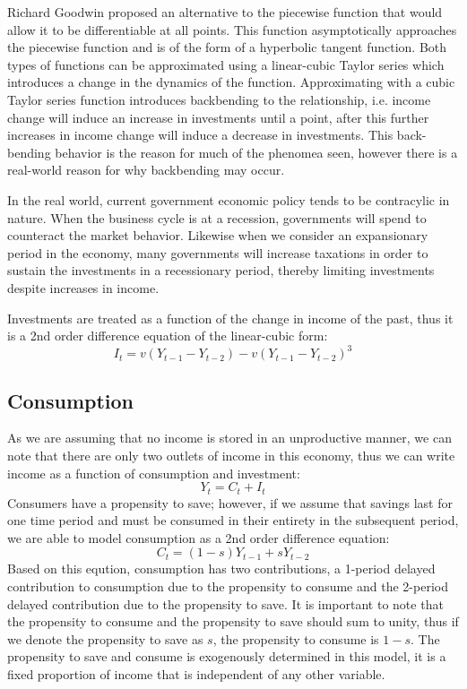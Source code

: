 \documentclass[]{article}
\begin{document}
	Richard Goodwin proposed an alternative to the piecewise function that would allow it to be differentiable at all points. This function asymptotically approaches the piecewise function and is of the form of a hyperbolic tangent function. Both types of functions can be approximated using a linear-cubic Taylor series which introduces a change in the dynamics of the function. Approximating with a cubic Taylor series function introduces backbending to the relationship, i.e. income change will induce an increase in investments until a point, after this further increases in income change will induce a decrease in investments. This back-bending behavior is the reason for much of the phenomea seen, however there is a real-world reason for why backbending may occur.

	In the real world, current government economic policy tends to be contracylic in nature. When the business cycle is at a recession, governments will spend to counteract the market behavior. Likewise when we consider an expansionary period in the economy, many governments will increase taxations in order to sustain the investments in a recessionary period, thereby limiting investments despite increases in income.

	Investments are treated as a function of the change in income of the past, thus it is a 2nd order difference equation of the linear-cubic form:
	\begin{equation}\label{eqn:inv}
		I_t=v(Y_{t-1}-Y_{t-2})-v(Y_{t-1}-Y_{t-2})^3
	\end{equation}

	\subsection*{Consumption}
	As we are assuming that no income is stored in an unproductive manner, we can note that there are only two outlets of income in this economy, thus we can write income as a function of consumption and investment:
	\begin{equation}\label{eqn:inc_c+1}
		Y_t=C_t+I_t
	\end{equation}
	Consumers have a propensity to save; however, if we assume that savings last for one time period and must be consumed in their entirety in the subsequent period, we are able to model consumption as a 2nd order difference equation:
	\begin{equation}
		C_t=(1-s)Y_{t-1}+sY_{t-2}
	\end{equation}
	Based on this eqution, consumption has two contributions, a 1-period delayed contribution to consumption due to the propensity to consume and the 2-period delayed contribution due to the propensity to save. It is important to note that the propensity to consume and the propensity to save should sum to unity, thus if we denote the propensity to save as $s$, the propensity to consume is $1-s$. The propensity to save and consume is exogenously determined in this model, it is a fixed proportion of income that is independent of any other variable.
\end{document}
